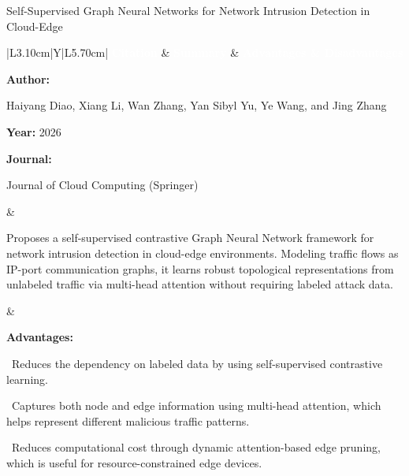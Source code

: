 \documentclass[aspectratio=169,10pt]{beamer}
\newcommand{\lrhdr}{%
  \rowcolor{prismNavy}%
  {\scriptsize\textcolor{white}{\textbf{Citation}}} &
  {\scriptsize\textcolor{white}{\textbf{Summary}}} &
  {\scriptsize\textcolor{white}{\textbf{Advantages \& Disadvantages}}} \\}
\begin{document}
\begin{frame}[t]{Self-Supervised Graph Neural Networks for Network Intrusion Detection in Cloud-Edge}
\vspace{-0.30em}
{\footnotesize\setlength{\tabcolsep}{3.5pt}\renewcommand{\arraystretch}{1.10}
\begin{tabularx}{\textwidth}{|L{3.10cm}|Y|L{5.70cm}|}
\hline\lrhdr\hline
\begin{minipage}[t]{\linewidth}\fontsize{7.2pt}{9.2pt}\raggedright\selectfont
\textbf{Author:}\par
Haiyang Diao, Xiang Li, Wan Zhang, Yan Sibyl Yu, Ye Wang, and Jing Zhang\par\vspace{4pt}
\textbf{Year:} 2026\par\vspace{4pt}
\textbf{Journal:}\par
Journal of Cloud Computing (Springer)\par\vspace{4pt}
\end{minipage}
&
\begin{minipage}[t]{\linewidth}\fontsize{7.2pt}{9.2pt}\raggedright\selectfont
Proposes a self-supervised contrastive Graph Neural Network framework for network intrusion detection in cloud-edge environments. Modeling traffic flows as IP-port communication graphs, it learns robust topological representations from unlabeled traffic via multi-head attention without requiring labeled attack data.\par\vspace{4pt}
\end{minipage}
&
\begin{minipage}[t]{\linewidth}\fontsize{6.6pt}{8.1pt}\raggedright\selectfont
\textcolor{strengthGreen}{\textbf{Advantages:}}\par\vspace{1.3pt}
\textbullet~Reduces the dependency on labeled data by using self-supervised contrastive learning.\par\vspace{1.8pt}\textbullet~Captures both node and edge information using multi-head attention, which helps represent different malicious traffic patterns.\par\vspace{1.8pt}\textbullet~Reduces computational cost through dynamic attention-based edge pruning, which is useful for resource-constrained edge devices.\par\vspace{3.2pt}

\end{minipage}
\end{tabularx}}
\end{frame}
\end{document}
